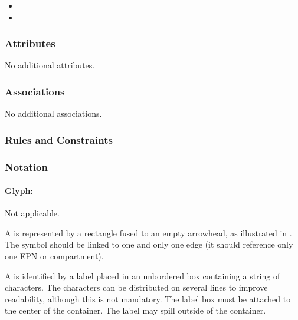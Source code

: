 \begin{itemize}
\item {}
\item {}
\end{itemize}

\subsubsection{Attributes}

No additional attributes.

\subsubsection{Associations}

No additional associations.

\subsubsection{Rules and Constraints}

\begin{valrules}
\end{valrules}


\subsubsection{Notation}

\paragraph{Glyph: }
\label{sec:techref:tag}

\begin{glyphDescription}

\glyphSboTerm Not applicable.

\glyphContainer A  is represented by a rectangle fused to an empty arrowhead, as illustrated in .  The symbol should be linked to one and only one edge (\ie it should reference only one EPN or compartment).

\glyphLabel A  is identified by a label placed in an unbordered box containing a string of characters.  The characters can be distributed on several lines to improve readability, although this is not mandatory.  The label box must be attached to the center of the container. The label may spill outside of the container.

\end{glyphDescription}

